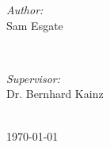 \begin{titlepage}
\begin{minipage}{0.4\textwidth}
\begin{flushleft} \large
\emph{Author:}\\
Sam Esgate %
\end{flushleft}
\end{minipage}
~
\begin{minipage}{0.4\textwidth}
\begin{flushright} \large
\emph{Supervisor:} \\
Dr. Bernhard Kainz %
\end{flushright}
\end{minipage}\\[7cm]



{\large \today}\\[3cm] %
 

\vfill %

\end{titlepage}